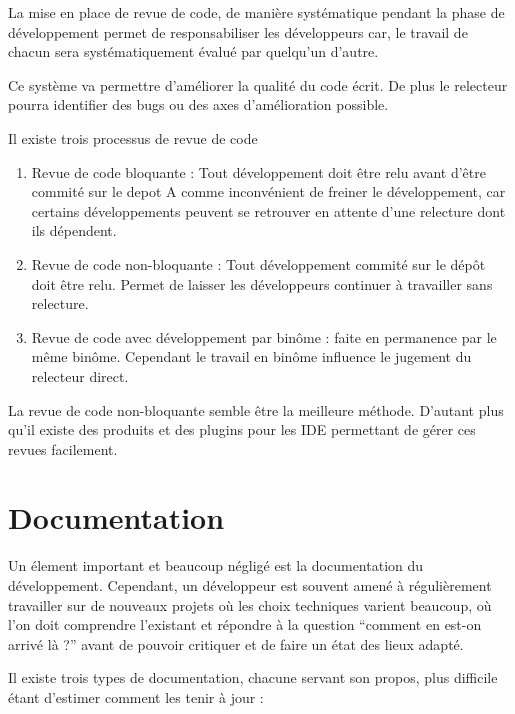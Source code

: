 La mise en place de revue de code, de manière systématique pendant la phase de développement permet de responsabiliser les développeurs car, le travail de chacun sera systématiquement évalué par quelqu'un d'autre. 

Ce système va permettre d'améliorer la qualité du code écrit. De plus le relecteur pourra identifier des bugs ou des axes d'amélioration possible. 

Il existe trois processus de revue de code 

\begin{enumerate}
    \item Revue de code bloquante : Tout développement doit être relu avant d'être commité sur le \gls{depot} 
    A comme inconvénient de freiner le développement, car certains développements peuvent se retrouver en attente d'une relecture dont ils dépendent. 
    \item Revue de code non-bloquante : Tout développement commité sur le dépôt doit être relu. 
    Permet de laisser les développeurs continuer à travailler sans relecture. 
    \item Revue de code avec développement par binôme : faite en permanence par le même binôme. 
    Cependant le travail en binôme influence le jugement du relecteur direct. 
\end{enumerate}

La revue de code non-bloquante semble être la meilleure méthode. D'autant plus qu'il existe des produits et des plugins pour les \gls{IDE} 
permettant de gérer ces revues facilement. 

\newpage

\section{Documentation}
Un élement important et beaucoup négligé est la documentation du développement. 
Cependant, un développeur est souvent amené à régulièrement travailler sur de nouveaux projets où les choix techniques varient beaucoup, où l'on doit comprendre l’existant et répondre à la question “comment en est-on arrivé là ?” avant de pouvoir critiquer et de faire un état des lieux adapté.

Il existe trois types de documentation, chacune servant son propos, plus difficile étant d’estimer comment les tenir à jour :


